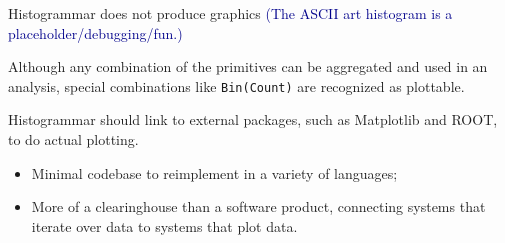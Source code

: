 \documentclass{beamer}
\begin{document}
\begin{frame}{Histogrammar does not produce graphics}
\textcolor{darkblue}{\large (The ASCII art histogram is a placeholder/debugging/fun.)}

\vfill
Although any combination of the primitives can be aggregated and used in an analysis, special combinations like {\tt Bin(Count)} are recognized as plottable.

\vfill
Histogrammar should link to external packages, such as Matplotlib and ROOT, to do actual plotting.
\begin{itemize}
\item Minimal codebase to reimplement in a variety of languages;
\item More of a clearinghouse than a software product, connecting systems that iterate over data to systems that plot data.
\end{itemize}
\end{frame}
\end{document}
